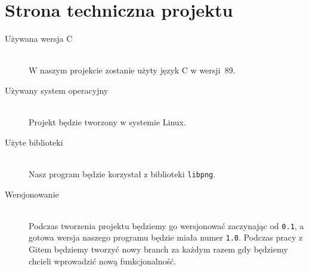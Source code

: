 \documentclass[a4paper,11pt, notitlepage ]{article}
\begin{document}
\section{Strona techniczna projektu}
\begin{description}
\item[Używana wersja C]\hfill \\
 W naszym projekcie zostanie użyty język C w wersji~89.
\item[Używany system operacyjny]\hfill \\
 Projekt będzie tworzony w systemie Linux.
\item[Użyte biblioteki]\hfill \\
 Nasz program będzie korzystał z biblioteki \verb+libpng+.
\item[Wersjonowanie]\hfill \\
 Podczas tworzenia projektu będziemy go wersjonować zaczynając od \verb+0.1+, a gotowa wersja naszego programu będzie miała numer \verb+1.0+. Podczas pracy z Gitem będziemy tworzyć nowy branch za każdym razem gdy będziemy chcieli wprowadzić nową funkcjonalność.



\end{description}
\end{document}
